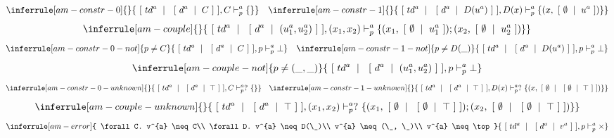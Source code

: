 \documentclass{article}
\newcommand\isfilteredta[3]{#1, #2 \vdash^{a}_p #3}
\newcommand\atval[2]{\ [\ #1\ \mid\ #2\ ]}
\newcommand\aval[2]{\ [\ #1\ \mid\ #2\ ]}
\begin{document}
$$
\inferrule [am-constr-0]
{  }
{ \isfilteredta{\atval{td^{a}}{\aval{d^{a}}{C}}}{C}{\{\}} }
\hspace{10pt}
\inferrule [am-constr-1]
{  }
{ \isfilteredta{\atval{td^{a}}{\aval{d^{a}}{D(u^{a})}}}{D(x)}{\{(x, \atval{\emptyset}{u^{a}})\}} }
$$
$$
\inferrule [am-couple]
{  }
{ \isfilteredta{\atval{td^{a}}{\aval{d^{a}}{(u^{a}_1, u^{a}_2)}}}{(x_1, x_2)}{\{(x_1, \atval{\emptyset}{u^{a}_1}); (x_2, \atval{\emptyset}{u^{a}_2})\}} }
$$
$$
\inferrule [am-constr-0-not]
{ p \neq C }
{ \isfilteredta{\atval{td^{a}}{\aval{d^{a}}{C}}}{p}{\bot} }
\hspace{10pt}
\inferrule [am-constr-1-not]
{ p \neq D(\_) }
{ \isfilteredta{\atval{td^{a}}{\aval{d^{a}}{D(u^{a})}}}{p}{\bot} }
$$
$$
\inferrule [am-couple-not]
{ p \neq (\_, \_) }
{ \isfilteredta{\atval{td^{a}}{\aval{d^{a}}{(u^{a}_1, u^{a}_2)}}}{p}{\bot} }
$$
$$
\inferrule [am-constr-0-unknown]
{  }
{ \isfilteredta{\atval{td^{a}}{\aval{d^{a}}{\top}}}{C}{?\ \{\}} }
\hspace{10pt}
\inferrule [am-constr-1-unknown]
{  }
{ \isfilteredta{\atval{td^{a}}{\aval{d^{a}}{\top}}}{D(x)}{?\ \{(x, \atval{\emptyset}{\aval{\emptyset}{\top}})\}} }
$$
$$
\inferrule [am-couple-unknown]
{  }
{ \isfilteredta{\atval{td^{a}}{\aval{d^{a}}{\top}}}{(x_1, x_2)}{?\ \{(x_1, \atval{\emptyset}{\aval{\emptyset}{\top}}); (x_2, \atval{\emptyset}{\aval{\emptyset}{\top}})\}} }
$$
$$
\inferrule [am-error]
{ \forall C. v^{a} \neq C\\
  \forall D. v^{a} \neq D(\_)\\
  v^{a} \neq (\_, \_)\\
  v^{a} \neq \top
}
{ \isfilteredta{\atval{td^{a}}{\aval{d^{a}}{v^{a}}}}{p}{\times} }
$$
\end{document}
